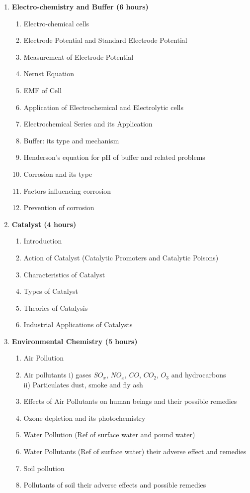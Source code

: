 \begin{enumerate}
    \item \textbf{Electro-chemistry and Buffer \hfill (6 hours)}
    \begin{enumerate}
        \item Electro-chemical cells
        \item Electrode Potential and Standard Electrode Potential 
        \item Measurement of Electrode Potential
        \item Nernst Equation
        \item EMF of Cell
        \item Application of Electrochemical and Electrolytic cells
        \item Electrochemical Series and its Application
        \item Buffer: its type and mechanism
        \item Henderson's equation for pH of buffer and related problems
        \item Corrosion and its type
        \item Factors influencing corrosion
        \item Prevention of corrosion
    \end{enumerate}
    
    \item \textbf{Catalyst \hfill (4 hours)}
    \begin{enumerate}
        \item Introduction
        \item Action of Catalyst (Catalytic Promoters and Catalytic Poisons)
        \item Characteristics of Catalyst
        \item Types of Catalyst
        \item Theories of Catalysis
        \item Industrial Applications of Catalysts
    \end{enumerate}
    
    \item \textbf{Environmental Chemistry \hfill (5 hours)}
    \begin{enumerate}
        \item Air Pollution
        \item Air pollutants i) gases $SO_x$, $NO_x$, $CO$, $CO_2$, $O_3$ and hydrocarbons \\
        ii) Particulates dust, smoke and fly ash
        \item Effects of Air Pollutants on human beings and their possible remedies
        \item Ozone depletion and its photochemistry
        \item Water Pollution (Ref of surface water and pound water)
        \item Water Pollutants (Ref of surface water) their adverse effect and remedies 
        \item Soil pollution
        \item Pollutants of soil their adverse effects and possible remedies
    \end{enumerate}
    

\end{enumerate}
